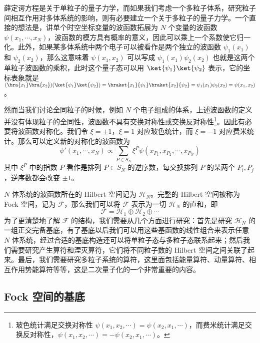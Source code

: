 

薛定谔方程是关于单粒子的量子力学，而如果我们考虑一个多粒子体系，研究粒子间相互作用对多体系统的影响，则有必要建立一个关于多粒子的量子力学。一个直接的想法是，讲单个时空坐标变量的波函数拓展为 $N$ 个变量的波函数 $\psi(x_1,\cdots,x_N)$，波函数的模方具有概率的意义，因此可以乘上一个系数使它归一化。此外，如果某多体系统中两个电子可以被看作是两个独立的波函数 $\psi_1(x_1)$ 和 $\psi_2(x_2)$，那么这意味着 $\psi(x_1,x_2)$ 可以写成 $\psi_1(x_1)\psi_2(x_2)$ 也就是这两个单粒子波函数的乘积，此时这个量子态可以用 $\ket{\psi_1}\ket{\psi_2}$ 表示，它的坐标表象就是 $(\bra{x_1}\bra{x_2})(\ket{\psi_1}\ket{\psi_2})=\braket{x_1}{\psi_1} \braket{x_2}{\psi_2}=\psi_1(x_1)\psi_2(x_2)=\psi(x_1,x_2)$。

然而当我们讨论全同粒子的时候，例如 $N$ 个电子组成的体系，上述波函数的定义并没有体现粒子的全同性，波函数不具有交换对称性或交换反对称性\footnote{玻色统计满足交换对称性 $\psi(x_1,x_2,\cdots)=\psi(x_2,x_1,\cdots)$，而费米统计满足交换反对称性，$\psi(x_1,x_2,\cdots)=-\psi(x_2,x_1,\cdots)$。}。因此有必要将波函数对称化。我们令 $\xi=\pm 1$，$\xi=1$ 对应玻色统计，而 $\xi=-1$ 对应费米统计。那么可以定义新的对称化的波函数为
\begin{equation}
\psi'(x_1,\cdots,x_N)\propto \sum_{P\in S_N} \xi^P \psi(x_{P_1},x_{P_2},\cdots,x_{P_N})
\end{equation}
其中 $\xi^P$ 中的指数 $P$ 看作是排列 $P\in S_N$ 的逆序数，每交换排列 $P$ 的某两个 $P_i,P_j$，逆序数都会改变 $\pm 1$。

$N$ 体系统的波函数所在的 Hilbert 空间记为 $\mathcal{H}_N$。完整的 Hilbert 空间被称为 Fock 空间，记为 $\mathcal{F}$，那么我们可以将 $\mathcal{F}$ 表示为一切 $\mathcal{H}_N$ 的直和，即
\begin{equation}\label{eq_SecQua_6}
\mathcal{F}=\mathcal{H}_1 \oplus \mathcal{H}_2 \oplus \cdots
\end{equation}
为了更清楚地了解 $\mathcal{F}$ 的结构，我们需要从几个方面进行研究：首先是研究 $\mathcal{H}_N$ 的一组正交完备基底，有了基底以后我们可以用这些基函数的线性组合来表示任意 $N$ 体系统，经过合适的基底构造还可以将单粒子态与多粒子态联系起来；然后我们需要研究产生算符和湮灭算符，它们将不同粒子数的 Hilbert 空间之间关联了起来。最后，我们需要研究多粒子系统的算符，这里面包括能量算符、动量算符、相互作用势能算符等等，这是二次量子化的一个非常重要的内容。
\subsection{Fock 空间的基底}
